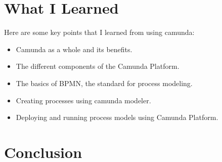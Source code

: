 \documentclass[12pt]{article}
\begin{document}
{\section{What I Learned}

Here are some key points that I learned from using camunda:

\begin{itemize}
  \item Camunda as a whole and its benefits.
  \item The different components of the Camunda Platform.
  \item The basics of BPMN, the standard for process modeling.
  \item Creating processes using camunda modeler.
  \item Deploying and running process models using Camunda Platform.
\end{itemize}

\pagebreak

\section{Conclusion}

}

\printbibliography
\end{document}
